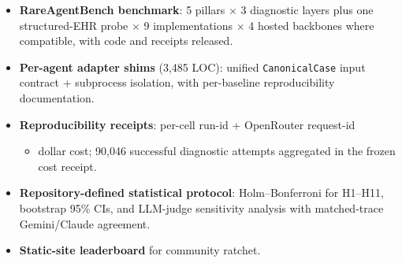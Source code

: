 \begin{itemize}
\tightlist
\item
  \textbf{RareAgentBench benchmark}: 5 pillars \ensuremath{\times} 3 diagnostic layers plus one
  structured-EHR probe \ensuremath{\times} 9 implementations \ensuremath{\times} 4 hosted backbones where
  compatible, with code and receipts released.
\item
  \textbf{Per-agent adapter shims} (3,485 LOC): unified \texttt{CanonicalCase} input
  contract + subprocess isolation, with per-baseline reproducibility
  documentation.
\item
  \textbf{Reproducibility receipts}: per-cell run-id + OpenRouter request-id

  \begin{itemize}
  \tightlist
  \item
    dollar cost; 90,046 successful diagnostic attempts aggregated in the
    frozen cost receipt.
  \end{itemize}
\item
  \textbf{Repository-defined statistical protocol}: Holm--Bonferroni for H1--H11,
  bootstrap 95\% CIs, and LLM-judge sensitivity analysis with matched-trace
  Gemini/Claude agreement.
\item
  \textbf{Static-site leaderboard} for community ratchet.
\end{itemize}


